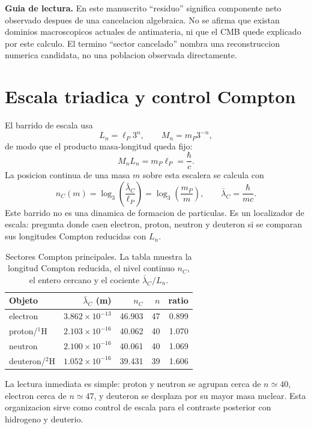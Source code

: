 \documentclass[10pt,twocolumn]{article}
\begin{document}
\noindent\textbf{Guia de lectura.} En este manuscrito ``residuo'' significa componente neto observado despues de una cancelacion algebraica. No se afirma que existan dominios macroscopicos actuales de antimateria, ni que el CMB quede explicado por este calculo. El termino ``sector cancelado'' nombra una reconstruccion numerica candidata, no una poblacion observada directamente.

\section{Escala triadica y control Compton}

El barrido de escala usa
\begin{equation}
L_n=\ell_P3^n,\qquad M_n=m_P3^{-n},
\end{equation}
de modo que el producto masa-longitud queda fijo:
\begin{equation}
M_nL_n=m_P\ell_P=\frac{\hbar}{c}.
\end{equation}
La posicion continua de una masa $m$ sobre esta escalera se calcula con
\begin{equation}
n_C(m)=\log_3\left(\frac{\bar{\lambda}_C}{\ell_P}\right)
=\log_3\left(\frac{m_P}{m}\right),
\qquad
\bar{\lambda}_C=\frac{\hbar}{mc}.
\end{equation}
Este barrido no es una dinamica de formacion de particulas. Es un localizador de escala: pregunta donde caen electron, proton, neutron y deuteron si se comparan sus longitudes Compton reducidas con $L_n$.

\begin{table}[h!]
\centering
\caption{Sectores Compton principales. La tabla muestra la longitud Compton reducida, el nivel continuo $n_C$, el entero cercano y el cociente $\bar{\lambda}_C/L_n$.}
\scriptsize
\begin{tabular}{lrrrr}
\hline
Objeto & $\bar{\lambda}_C$ (m) & $n_C$ & $n$ & ratio\\
\hline
electron & $3.862{\times}10^{-13}$ & 46.903 & 47 & 0.899\\
proton/$^1$H & $2.103{\times}10^{-16}$ & 40.062 & 40 & 1.070\\
neutron & $2.100{\times}10^{-16}$ & 40.061 & 40 & 1.069\\
deuteron/$^2$H & $1.052{\times}10^{-16}$ & 39.431 & 39 & 1.606\\
\hline
\end{tabular}
\end{table}

La lectura inmediata es simple: proton y neutron se agrupan cerca de $n\simeq40$, electron cerca de $n\simeq47$, y deuteron se desplaza por su mayor masa nuclear. Esta organizacion sirve como control de escala para el contraste posterior con hidrogeno y deuterio.
\end{document}
